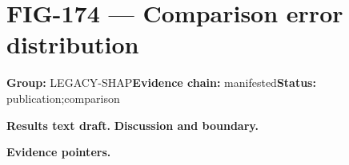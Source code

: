 \clearpage
\section{FIG-174 --- Comparison error distribution}
\label{figpage:fig-174}
\textbf{Group:} LEGACY-SHAP\quad \textbf{Evidence chain:} manifested\quad \textbf{Status:} publication;comparison

\textbf{Results text draft.} 
\textbf{Discussion and boundary.} 


\textbf{Evidence pointers.}



\vfill
